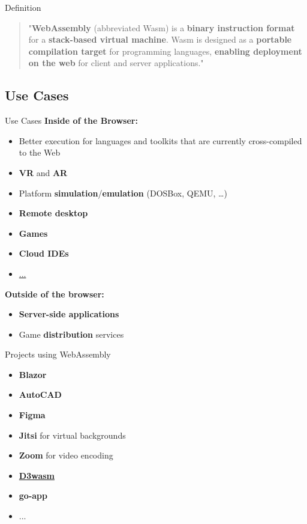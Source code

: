 \documentclass{beamer}
\begin{document}
\begin{frame}{Definition}
    \begin{quotation}
        "\textbf{WebAssembly} (abbreviated Wasm) is a \textbf{binary instruction format} for a \textbf{stack-based virtual machine}. Wasm is designed as a \textbf{portable compilation target} for programming languages, \textbf{enabling deployment on the web} for client and server applications."
    \end{quotation}
\end{frame}

\subsection{Use Cases}

\begin{frame}{Use Cases}
    \textbf{Inside of the Browser:}
    \begin{itemize}
        \item Better execution for languages and toolkits that are currently cross-compiled to the Web
        \item \textbf{VR} and \textbf{AR}
        \item Platform \textbf{simulation}/\textbf{emulation} (DOSBox, QEMU, …)
        \item \textbf{Remote desktop}
        \item \textbf{Games}
        \item \textbf{Cloud IDEs}
        \item \href{https://webassembly.org/docs/use-cases/}{...}
    \end{itemize}
    \textbf{Outside of the browser:}
    \begin{itemize}
        \item \textbf{Server-side applications}
        \item Game \textbf{distribution} services
    \end{itemize}
\end{frame}

\begin{frame}{Projects using WebAssembly}
    \begin{itemize}
        \item \textbf{Blazor}
        \item \textbf{AutoCAD}
        \item \textbf{Figma}
        \item \textbf{Jitsi} for virtual backgrounds
        \item \textbf{Zoom} for video encoding
        \item \textbf{\href{https://wasm.continuation-labs.com/d3demo/}{D3wasm}}
        \item \textbf{go-app}
        \item ...
    \end{itemize}
\end{frame}
\end{document}
